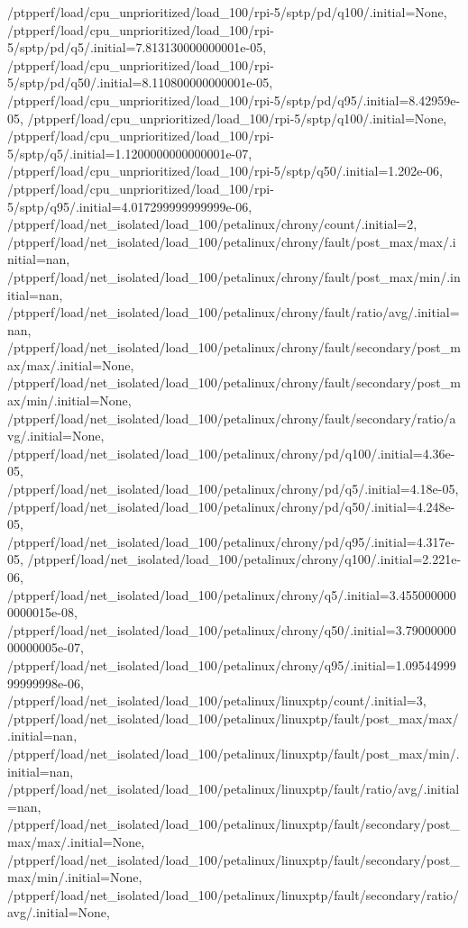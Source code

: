 {    /ptpperf/load/cpu_unprioritized/load_100/rpi-5/sptp/pd/q100/.initial=None,
    /ptpperf/load/cpu_unprioritized/load_100/rpi-5/sptp/pd/q5/.initial=7.813130000000001e-05,
    /ptpperf/load/cpu_unprioritized/load_100/rpi-5/sptp/pd/q50/.initial=8.110800000000001e-05,
    /ptpperf/load/cpu_unprioritized/load_100/rpi-5/sptp/pd/q95/.initial=8.42959e-05,
    /ptpperf/load/cpu_unprioritized/load_100/rpi-5/sptp/q100/.initial=None,
    /ptpperf/load/cpu_unprioritized/load_100/rpi-5/sptp/q5/.initial=1.1200000000000001e-07,
    /ptpperf/load/cpu_unprioritized/load_100/rpi-5/sptp/q50/.initial=1.202e-06,
    /ptpperf/load/cpu_unprioritized/load_100/rpi-5/sptp/q95/.initial=4.017299999999999e-06,
    /ptpperf/load/net_isolated/load_100/petalinux/chrony/count/.initial=2,
    /ptpperf/load/net_isolated/load_100/petalinux/chrony/fault/post_max/max/.initial=nan,
    /ptpperf/load/net_isolated/load_100/petalinux/chrony/fault/post_max/min/.initial=nan,
    /ptpperf/load/net_isolated/load_100/petalinux/chrony/fault/ratio/avg/.initial=nan,
    /ptpperf/load/net_isolated/load_100/petalinux/chrony/fault/secondary/post_max/max/.initial=None,
    /ptpperf/load/net_isolated/load_100/petalinux/chrony/fault/secondary/post_max/min/.initial=None,
    /ptpperf/load/net_isolated/load_100/petalinux/chrony/fault/secondary/ratio/avg/.initial=None,
    /ptpperf/load/net_isolated/load_100/petalinux/chrony/pd/q100/.initial=4.36e-05,
    /ptpperf/load/net_isolated/load_100/petalinux/chrony/pd/q5/.initial=4.18e-05,
    /ptpperf/load/net_isolated/load_100/petalinux/chrony/pd/q50/.initial=4.248e-05,
    /ptpperf/load/net_isolated/load_100/petalinux/chrony/pd/q95/.initial=4.317e-05,
    /ptpperf/load/net_isolated/load_100/petalinux/chrony/q100/.initial=2.221e-06,
    /ptpperf/load/net_isolated/load_100/petalinux/chrony/q5/.initial=3.4550000000000015e-08,
    /ptpperf/load/net_isolated/load_100/petalinux/chrony/q50/.initial=3.7900000000000005e-07,
    /ptpperf/load/net_isolated/load_100/petalinux/chrony/q95/.initial=1.0954499999999998e-06,
    /ptpperf/load/net_isolated/load_100/petalinux/linuxptp/count/.initial=3,
    /ptpperf/load/net_isolated/load_100/petalinux/linuxptp/fault/post_max/max/.initial=nan,
    /ptpperf/load/net_isolated/load_100/petalinux/linuxptp/fault/post_max/min/.initial=nan,
    /ptpperf/load/net_isolated/load_100/petalinux/linuxptp/fault/ratio/avg/.initial=nan,
    /ptpperf/load/net_isolated/load_100/petalinux/linuxptp/fault/secondary/post_max/max/.initial=None,
    /ptpperf/load/net_isolated/load_100/petalinux/linuxptp/fault/secondary/post_max/min/.initial=None,
    /ptpperf/load/net_isolated/load_100/petalinux/linuxptp/fault/secondary/ratio/avg/.initial=None,
}

